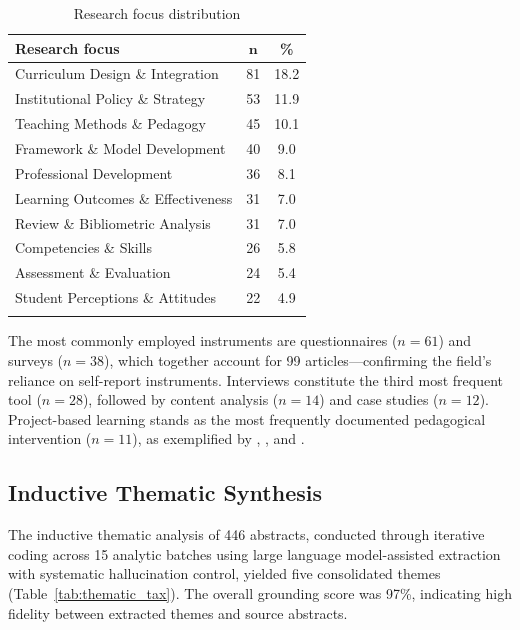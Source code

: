 \documentclass[pdflatex,sn-basic]{sn-jnl}%
\begin{document}
\begin{table}[htbp]
\centering
\caption{Research focus distribution}\label{tab:research_focus}
\begin{tabular}{l c c}
\toprule
\textbf{Research focus} & $\boldsymbol{n}$ & \textbf{\%} \\
\midrule
Curriculum Design \& Integration & 81 & 18.2 \\
Institutional Policy \& Strategy & 53 & 11.9 \\
Teaching Methods \& Pedagogy & 45 & 10.1 \\
Framework \& Model Development & 40 & 9.0 \\
Professional Development & 36 & 8.1 \\
Learning Outcomes \& Effectiveness & 31 & 7.0 \\
Review \& Bibliometric Analysis & 31 & 7.0 \\
Competencies \& Skills & 26 & 5.8 \\
Assessment \& Evaluation & 24 & 5.4 \\
Student Perceptions \& Attitudes & 22 & 4.9 \\
\botrule
\end{tabular}
\end{table}

The most commonly employed instruments are questionnaires ($n = 61$) and surveys ($n = 38$), which together account for 99 articles---confirming the field's reliance on self-report instruments. Interviews constitute the third most frequent tool ($n = 28$), followed by content analysis ($n = 14$) and case studies ($n = 12$). Project-based learning stands as the most frequently documented pedagogical intervention ($n = 11$), as exemplified by \cite{fuertes_camacho_integrating_2019}, \cite{cottafava_education_2019}, and \cite{ariza_bringing_2023}.

\subsection{Inductive Thematic Synthesis}

The inductive thematic analysis of 446 abstracts, conducted through iterative coding across 15 analytic batches using large language model-assisted extraction with systematic hallucination control, yielded five consolidated themes (Table~\ref{tab:thematic_tax}). The overall grounding score was 97\%, indicating high fidelity between extracted themes and source abstracts.
\end{document}
